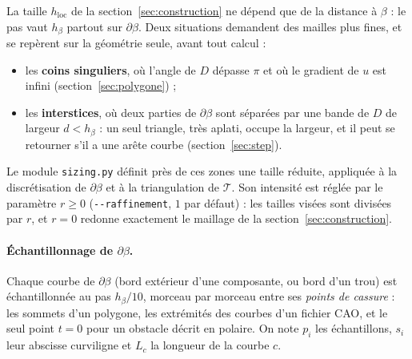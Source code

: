 \documentclass[11pt,a4paper]{article}
\begin{document}
La taille $h_{\mathrm{loc}}$ de la section~\ref{sec:construction} ne dépend
que de la distance à $\beta$ : le pas vaut $h_\beta$ partout sur
$\partial\beta$. Deux situations demandent des mailles plus fines, et se
repèrent sur la géométrie seule, avant tout calcul :
\begin{itemize}
  \item les \textbf{coins singuliers}, où l'angle de $D$ dépasse $\pi$ et où
        le gradient de $u$ est infini (section~\ref{sec:polygone}) ;
  \item les \textbf{interstices}, où deux parties de $\partial\beta$ sont
        séparées par une bande de $D$ de largeur $d < h_\beta$ : un seul
        triangle, très aplati, occupe la largeur, et il peut se retourner
        s'il a une arête courbe (section~\ref{sec:step}).
\end{itemize}
Le module \texttt{sizing.py} définit près de ces zones une taille réduite,
appliquée à la discrétisation de $\partial\beta$ et à la triangulation de
$\mathcal{T}$. Son intensité est réglée par le paramètre $r \ge 0$
(\texttt{-{}-raffinement}, $1$ par défaut) : les tailles visées sont divisées
par $r$, et $r = 0$ redonne exactement le maillage de la
section~\ref{sec:construction}.

\paragraph{Échantillonnage de $\partial\beta$.} Chaque courbe de
$\partial\beta$ (bord extérieur d'une composante, ou bord d'un trou) est
échantillonnée au pas $h_\beta / 10$, morceau par morceau entre
ses \emph{points de cassure} : les sommets d'un polygone, les extrémités des
courbes d'un fichier CAO, et le seul point $t = 0$ pour un obstacle décrit
en polaire. On note $p_i$ les échantillons, $s_i$ leur abscisse curviligne
et $L_c$ la longueur de la courbe $c$.
\end{document}
